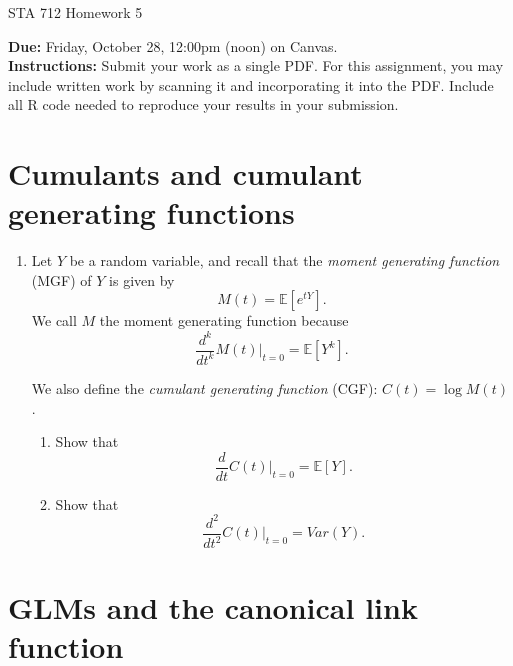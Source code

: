 \documentclass[11pt]{article}
\begin{document}
\begin{center}
\Large
STA 712 Homework 5\\
\normalsize
\vspace{5mm}
\end{center}

\noindent \textbf{Due:} Friday, October 28, 12:00pm (noon) on Canvas.\\ 

\noindent \textbf{Instructions:} Submit your work as a single PDF. For this assignment, you may include written work by scanning it and incorporating it into the PDF. Include all R code needed to reproduce your results in your submission.

\section*{Cumulants and cumulant generating functions}

\begin{enumerate}
\item Let $Y$ be a random variable, and recall that the \textit{moment generating function} (MGF) of $Y$ is given by
$$M(t) = \mathbb{E}[e^{tY}].$$
We call $M$ the moment generating function because
$$ \dfrac{d^k}{dt^k} M(t) \biggr \rvert_{t=0} = \mathbb{E}[Y^k].$$

We also define the \textit{cumulant generating function} (CGF): $C(t) = \log M(t)$.

\begin{enumerate}
\item Show that
$$ \dfrac{d}{dt} C(t) \biggr \rvert_{t=0} = \mathbb{E}[Y]. $$

\item Show that
$$ \dfrac{d^2}{dt^2} C(t) \biggr \rvert_{t=0} = Var(Y). $$
\end{enumerate}
\end{enumerate}

\section*{GLMs and the canonical link function}
\end{document}
